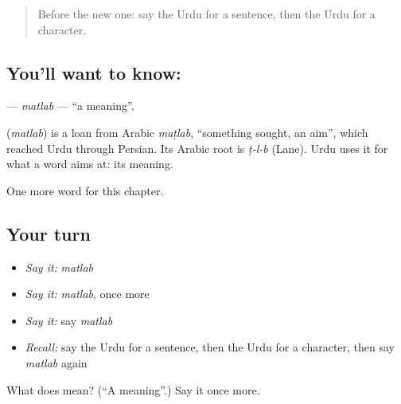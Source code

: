 \begin{quote}
Before the new one: say the Urdu for a sentence, then the Urdu for a character.
\end{quote}

\subsection*{You'll want to know: }
\textbf{} — \emph{matlab} — \textquotedblleft{}a meaning\textquotedblright{}.

\begin{cousinweb}
\textbf{} (\emph{matlab}) is a loan from Arabic \emph{maṭlab}, \textquotedblleft{}something sought, an aim\textquotedblright{}, which reached Urdu through Persian. Its Arabic root is \emph{ṭ-l-b} (Lane). Urdu uses it for what a word aims at: its meaning.
\end{cousinweb}

\begin{grammarlens}[title={What you've built}]
One more word for this chapter.
\end{grammarlens}

\subsection*{Your turn}
\begin{itemize}
\raggedright
  \item \emph{Say it:} \emph{matlab}
  \item \emph{Say it:} \emph{matlab}, once more
  \item \emph{Say it:} say \emph{matlab}
  \item \emph{Recall:} say the Urdu for a sentence, then the Urdu for a character, then say \emph{matlab} again
\end{itemize}

\begin{tcolorbox}[breakable,colback=teal!4,colframe=teal!35!black,title={Before you move on}]
What does  mean? (\textquotedblleft{}A meaning\textquotedblright{}.) Say it once more.
\end{tcolorbox}
